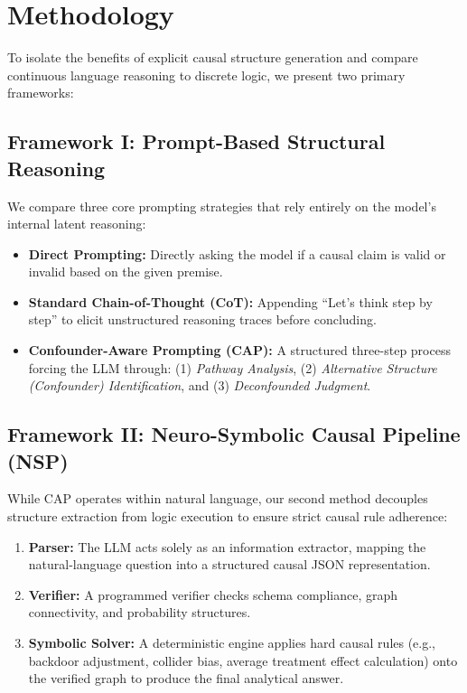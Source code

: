 \documentclass{article}
\theoremstyle{plain}
\theoremstyle{definition}
\theoremstyle{remark}
\begin{document}
\section{Methodology}

To isolate the benefits of explicit causal structure generation and compare continuous language reasoning to discrete logic, we present two primary frameworks:

\subsection{Framework I: Prompt-Based Structural Reasoning}

We compare three core prompting strategies that rely entirely on the model's internal latent reasoning:
\begin{itemize}
    \item \textbf{Direct Prompting:} Directly asking the model if a causal claim is valid or invalid based on the given premise.
    \item \textbf{Standard Chain-of-Thought (CoT):} Appending ``Let's think step by step'' to elicit unstructured reasoning traces before concluding.
    \item \textbf{Confounder-Aware Prompting (CAP):} A structured three-step process forcing the LLM through: (1) \textit{Pathway Analysis}, (2) \textit{Alternative Structure (Confounder) Identification}, and (3) \textit{Deconfounded Judgment}.
\end{itemize}

\subsection{Framework II: Neuro-Symbolic Causal Pipeline (NSP)}

While CAP operates within natural language, our second method decouples structure extraction from logic execution to ensure strict causal rule adherence:
\begin{enumerate}
    \item \textbf{Parser:} The LLM acts solely as an information extractor, mapping the natural-language question into a structured causal JSON representation.
    \item \textbf{Verifier:} A programmed verifier checks schema compliance, graph connectivity, and probability structures.
    \item \textbf{Symbolic Solver:} A deterministic engine applies hard causal rules (e.g., backdoor adjustment, collider bias, average treatment effect calculation) onto the verified graph to produce the final analytical answer.
\end{enumerate}
\end{document}
